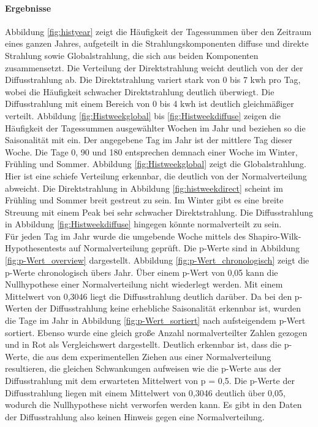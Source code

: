 \paragraph{Ergebnisse}
Abbildung \ref{fig:histyear} zeigt die Häufigkeit der Tagessummen über den Zeitraum eines ganzen Jahres, aufgeteilt in die Strahlungskomponenten diffuse und direkte Strahlung sowie Globalstrahlung, die sich aus beiden Komponenten zusammensetzt. Die Verteilung der Direktstrahlung weicht deutlich von der der Diffusstrahlung ab. Die Direktstrahlung variert stark von 0 bis 7 kwh pro Tag, wobei die Häufigkeit schwacher Direktstrahlung deutlich überwiegt. Die Diffusstrahlung mit einem Bereich von 0 bis 4 kwh ist deutlich gleichmäßiger verteilt.
Abbildung \ref{fig:Histweekglobal} bis \ref{fig:Histweekdiffuse} zeigen die Häufigkeit der Tagessummen ausgewählter Wochen im Jahr und beziehen so die Saisonalität mit ein. Der angegebene Tag im Jahr ist der mittlere Tag dieser Woche. Die Tage 0, 90 und 180 entsprechen demnach einer Woche im Winter, Frühling und Sommer. Abbildung \ref{fig:Histweekglobal} zeigt die Globalstrahlung. Hier ist eine schiefe Verteilung erkennbar, die deutlich von der Normalverteilung abweicht. Die Direktstrahlung in Abbildung \ref{fig:histweekdirect} scheint im Frühling und Sommer breit gestreut zu sein. Im Winter gibt es eine breite Streuung mit einem Peak bei sehr schwacher Direktstrahlung. Die Diffusstrahlung in Abbildung \ref{fig:Histweekdiffuse} hingegen könnte normalverteilt zu sein. \\
Für jeden Tag im Jahr wurde die umgebende Woche mittels des Shapiro-Wilk-Hypothesentests auf Normalverteilung geprüft. Die p-Werte sind in Abbildung \ref{fig:p-Wert_overview} dargestellt. Abbildung \ref{fig:p-Wert_chronologisch} zeigt die p-Werte chronologisch übers Jahr. Über einem p-Wert von 0,05 kann die Nullhypothese einer Normalverteilung nicht wiederlegt werden. Mit einem Mittelwert von 0,3046 liegt die Diffusstrahlung deutlich darüber. Da bei den p-Werten der Diffusstrahlung keine erhebliche Saisonalität erkennbar ist, wurden die Tage im Jahr in Abbildung \ref{fig:p-Wert_sortiert} nach aufsteigendem p-Wert sortiert. Ebenso wurde eine gleich große Anzahl normalverteilter Zahlen gezogen und in Rot als Vergleichswert dargestellt. Deutlich erkennbar ist, dass die p-Werte, die aus dem experimentellen Ziehen aus einer Normalverteilung resultieren, die gleichen Schwankungen aufweisen wie die p-Werte aus der Diffusstrahlung mit dem erwarteten Mittelwert von p = 0,5. Die p-Werte der Diffusstrahlung liegen mit einem Mittelwert von 0,3046 deutlich über 0,05, wodurch die Nullhypothese nicht verworfen werden kann. Es gibt in den Daten der Diffusstrahlung also keinen Hinweis gegen eine Normalverteilung. 
